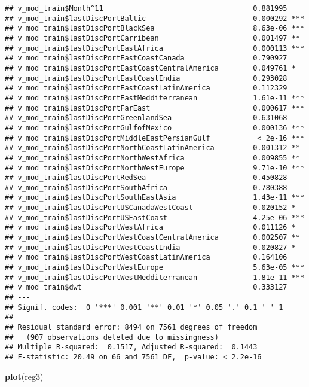 \documentclass[]{article}
\newenvironment{Shaded}{\begin{snugshade}}{\end{snugshade}}
\newcommand{\KeywordTok}[1]{\textcolor[rgb]{0.13,0.29,0.53}{\textbf{#1}}}
\newcommand{\NormalTok}[1]{#1}
\begin{document}
\begin{verbatim}
## v_mod_train$Month^11                                   0.881995    
## v_mod_train$lastDiscPortBaltic                         0.000292 ***
## v_mod_train$lastDiscPortBlackSea                       8.63e-06 ***
## v_mod_train$lastDiscPortCarribean                      0.001497 ** 
## v_mod_train$lastDiscPortEastAfrica                     0.000113 ***
## v_mod_train$lastDiscPortEastCoastCanada                0.790927    
## v_mod_train$lastDiscPortEastCoastCentralAmerica        0.049761 *  
## v_mod_train$lastDiscPortEastCoastIndia                 0.293028    
## v_mod_train$lastDiscPortEastCoastLatinAmerica          0.112329    
## v_mod_train$lastDiscPortEastMedditerranean             1.61e-11 ***
## v_mod_train$lastDiscPortFarEast                        0.000617 ***
## v_mod_train$lastDiscPortGreenlandSea                   0.631068    
## v_mod_train$lastDiscPortGulfofMexico                   0.000136 ***
## v_mod_train$lastDiscPortMiddleEastPersianGulf           < 2e-16 ***
## v_mod_train$lastDiscPortNorthCoastLatinAmerica         0.001312 ** 
## v_mod_train$lastDiscPortNorthWestAfrica                0.009855 ** 
## v_mod_train$lastDiscPortNorthWestEurope                9.71e-10 ***
## v_mod_train$lastDiscPortRedSea                         0.450828    
## v_mod_train$lastDiscPortSouthAfrica                    0.780388    
## v_mod_train$lastDiscPortSouthEastAsia                  1.43e-11 ***
## v_mod_train$lastDiscPortUSCanadaWestCoast              0.020152 *  
## v_mod_train$lastDiscPortUSEastCoast                    4.25e-06 ***
## v_mod_train$lastDiscPortWestAfrica                     0.011126 *  
## v_mod_train$lastDiscPortWestCoastCentralAmerica        0.002507 ** 
## v_mod_train$lastDiscPortWestCoastIndia                 0.020827 *  
## v_mod_train$lastDiscPortWestCoastLatinAmerica          0.164106    
## v_mod_train$lastDiscPortWestEurope                     5.63e-05 ***
## v_mod_train$lastDiscPortWestMedditerranean             1.81e-11 ***
## v_mod_train$dwt                                        0.333127    
## ---
## Signif. codes:  0 '***' 0.001 '**' 0.01 '*' 0.05 '.' 0.1 ' ' 1
## 
## Residual standard error: 8494 on 7561 degrees of freedom
##   (907 observations deleted due to missingness)
## Multiple R-squared:  0.1517, Adjusted R-squared:  0.1443 
## F-statistic: 20.49 on 66 and 7561 DF,  p-value: < 2.2e-16
\end{verbatim}

\begin{Shaded}
\begin{Highlighting}[]
\KeywordTok{plot}\NormalTok{(reg3)}
\end{Highlighting}
\end{Shaded}
\end{document}
